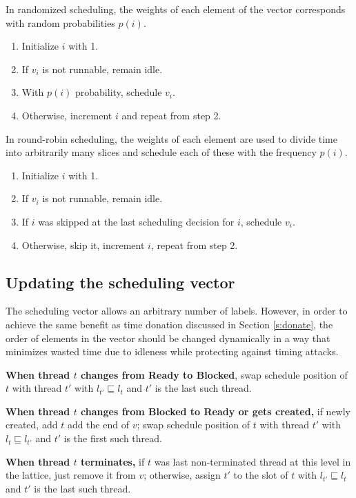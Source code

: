 \documentclass[10pt,preprint]{sigplanconf}
\begin{document}
In randomized scheduling, the weights of each element of the vector corresponds with random probabilities $p(i)$.
\begin{enumerate}
  \item Initialize $i$ with 1.
  \item If $v_i$ is not runnable, remain idle.
  \item With $p(i)$ probability, schedule $v_i$.
  \item Otherwise, increment $i$ and repeat from step 2.
\end{enumerate}
In round-robin scheduling, the weights of each element are used to divide time into arbitrarily many slices and schedule each of these with the frequency $p(i)$.
\begin{enumerate}
  \item Initialize $i$ with 1.
  \item If $v_i$ is not runnable, remain idle.
  \item If $i$ was skipped at the last scheduling decision for $i$, schedule $v_i$.
  \item Otherwise, skip it, increment $i$, repeat from step 2.
\end{enumerate}

\subsection{Updating the scheduling vector}

The scheduling vector allows an arbitrary number of labels.  However, in order to achieve the same benefit as time donation discussed in Section \ref{s:donate}, the order of elements in the vector should be changed dynamically in a way that minimizes wasted time due to idleness while protecting against timing attacks.

\textbf{When thread $t$ changes from Ready to Blocked}, swap schedule position of $t$ with thread $t'$ with $l_{t'} \sqsubseteq l_t$ and $t'$ is the last such thread.

\textbf{When thread $t$ changes from Blocked to Ready or gets created,} if newly created, add $t$ add the end of $v$; swap schedule position of $t$ with thread $t'$ with $l_{t} \sqsubseteq l_{t'}$ and $t'$ is the first such thread.

\textbf{When thread $t$ terminates,} if $t$ was last non-terminated thread at this level in the lattice, just remove it from $v$; otherwise, assign $t'$ to the slot of $t$ with $l_{t'} \sqsubseteq l_t$ and $t'$ is the last such thread.
\end{document}
